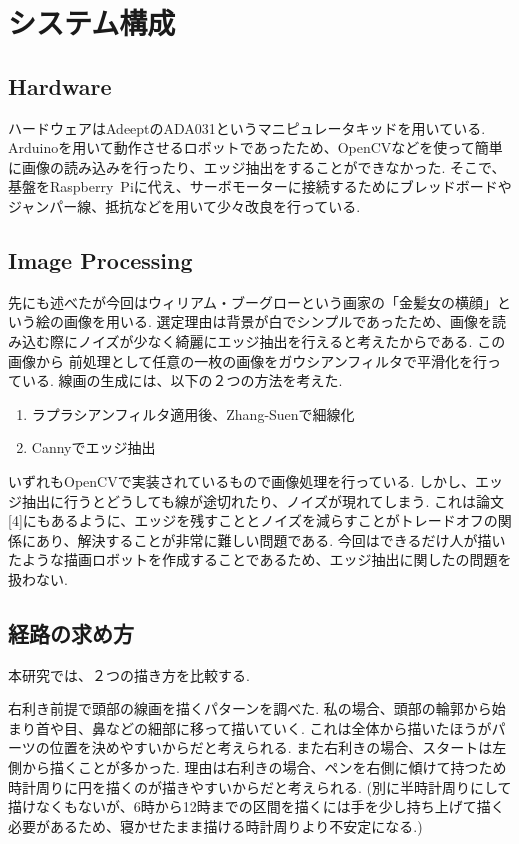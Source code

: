 \documentclass[10pt]{jarticle}
\begin{document}
    
    
    
    \section{システム構成}
	\subsection{Hardware}
	ハードウェアはAdeeptのADA031というマニピュレータキッドを用いている.
	Arduinoを用いて動作させるロボットであったため、OpenCVなどを使って簡単に画像の読み込みを行ったり、エッジ抽出をすることができなかった.
	そこで、基盤をRaspberry\ Piに代え、サーボモーターに接続するためにブレッドボードやジャンパー線、抵抗などを用いて少々改良を行っている.

	\subsection{Image Processing}
	先にも述べたが今回はウィリアム・ブーグローという画家の「金髪女の横顔」という絵の画像を用いる.
	選定理由は背景が白でシンプルであったため、画像を読み込む際にノイズが少なく綺麗にエッジ抽出を行えると考えたからである.
	この画像から
	前処理として任意の一枚の画像をガウシアンフィルタで平滑化を行っている.
	線画の生成には、以下の２つの方法を考えた.
	\begin{enumerate}
		\item ラプラシアンフィルタ適用後、Zhang-Suenで細線化
		\item Cannyでエッジ抽出
	\end{enumerate}
	いずれもOpenCVで実装されているもので画像処理を行っている.
	しかし、エッジ抽出に行うとどうしても線が途切れたり、ノイズが現れてしまう.
	これは論文[4]にもあるように、エッジを残すこととノイズを減らすことがトレードオフの関係にあり、解決することが非常に難しい問題である.
	今回はできるだけ人が描いたような描画ロボットを作成することであるため、エッジ抽出に関したの問題を扱わない.


	
	\subsection{経路の求め方}
	本研究では、２つの描き方を比較する.

	右利き前提で頭部の線画を描くパターンを調べた.
	私の場合、頭部の輪郭から始まり首や目、鼻などの細部に移って描いていく.
	これは全体から描いたほうがパーツの位置を決めやすいからだと考えられる.
	また右利きの場合、スタートは左側から描くことが多かった.
	理由は右利きの場合、ペンを右側に傾けて持つため時計周りに円を描くのが描きやすいからだと考えられる.
	(別に半時計周りにして描けなくもないが、6時から12時までの区間を描くには手を少し持ち上げて描く必要があるため、寝かせたまま描ける時計周りより不安定になる.)
	
\end{document}
